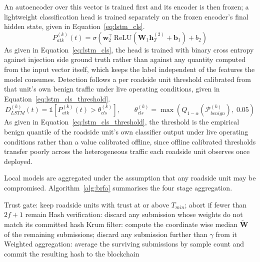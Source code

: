 \documentclass[lettersize,journal]{IEEEtran}
\theoremstyle{plain}
\theoremstyle{remark}
\begin{document}
	An autoencoder over this vector is trained first and its encoder is then
	frozen; a lightweight classification head is trained separately on the
	frozen encoder's final hidden state, given in Equation~\eqref{eq:lstm_cls}.
	\begin{equation}
		P_{atk}^{(k)}(t) =
		\sigma\!\left(\mathbf{w}_2^{\top}\,
		\mathrm{ReLU}\!\left(\mathbf{W}_1 \mathbf{h}^{(2)}_T + \mathbf{b}_1\right)
		+ b_2\right)
		\label{eq:lstm_cls}
	\end{equation}
	As given in Equation~\eqref{eq:lstm_cls}, the head is trained with binary
	cross entropy against injection side ground truth rather than against
	any quantity computed from the input vector itself, which keeps the
	label independent of the features the model consumes. Detection follows
	a per roadside unit threshold calibrated from that unit's own benign
	traffic under live operating conditions, given in
	Equation~\eqref{eq:lstm_cls_threshold}.
	\begin{equation}
		D_{LSTM}^{(k)}(t) = \mathbb{1}\!\left[P_{atk}^{(k)}(t) > \theta_{cls}^{(k)}\right],
		\qquad
		\theta_{cls}^{(k)} = \max\!\left(
		Q_{1-\alpha}\!\left(\mathcal{P}^{(k)}_{benign}\right),\; 0.05\right)
		\label{eq:lstm_cls_threshold}
	\end{equation}
	As given in Equation~\eqref{eq:lstm_cls_threshold}, the threshold is the
	empirical benign quantile of the roadside unit's own classifier output
	under live operating conditions rather than a value calibrated offline,
	since offline calibrated thresholds transfer poorly across the
	heterogeneous traffic each roadside unit observes once deployed.
	
	Local models are aggregated under the assumption that any roadside unit
	may be compromised. Algorithm~\ref{alg:brfa} summarises the four stage
	aggregation.
	\begin{algorithm}[!t]
		\caption{Byzantine Robust Federated Aggregation}
		\label{alg:brfa}
		\begin{algorithmic}[1]
			\State Trust gate: keep roadside units with trust at or above $T_{min}$; abort if fewer than $2f{+}1$ remain
			\State Hash verification: discard any submission whose weights do not match its committed hash
			\State Krum filter: compute the coordinate wise median $\tilde{\mathbf{W}}$ of the remaining submissions; discard any submission further than $\gamma$ from it
			\State Weighted aggregation: average the surviving submissions by sample count and commit the resulting hash to the blockchain
		\end{algorithmic}
	\end{algorithm}
	
\end{document}
